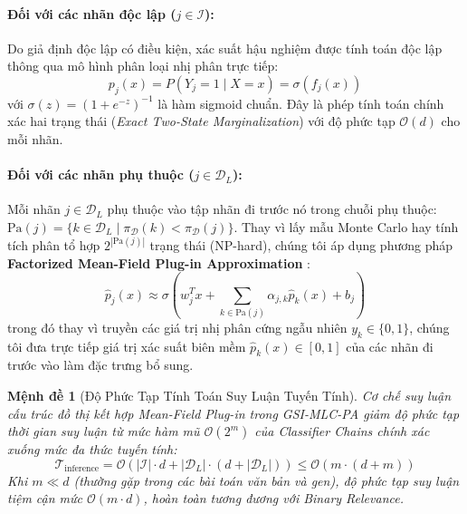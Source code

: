 \documentclass[11pt,a4paper]{article}
\newtheorem{proposition}{Mệnh đề}[section]
\begin{document}
\paragraph{Đối với các nhãn độc lập ($j \in \mathcal{I}$):}
Do giả định độc lập có điều kiện, xác suất hậu nghiệm được tính toán độc lập thông qua mô hình phân loại nhị phân trực tiếp:
\begin{equation}
p_j(x) = P(Y_j = 1 \mid X = x) = \sigma(f_j(x))
\label{eq:inference_il}
\end{equation}
với $\sigma(z) = (1 + e^{-z})^{-1}$ là hàm sigmoid chuẩn. Đây là phép tính toán chính xác hai trạng thái (\textit{Exact Two-State Marginalization}) với độ phức tạp $\mathcal{O}(d)$ cho mỗi nhãn.

\paragraph{Đối với các nhãn phụ thuộc ($j \in \mathcal{D}_L$):}
Mỗi nhãn $j \in \mathcal{D}_L$ phụ thuộc vào tập nhãn đi trước nó trong chuỗi phụ thuộc: $\mathrm{Pa}(j) = \{k \in \mathcal{D}_L \mid \pi_{\mathcal{D}}(k) < \pi_{\mathcal{D}}(j)\}$. Thay vì lấy mẫu Monte Carlo hay tính tích phân tổ hợp $2^{|\mathrm{Pa}(j)|}$ trạng thái (NP-hard), chúng tôi áp dụng phương pháp \textbf{Factorized Mean-Field Plug-in Approximation} \cite{dembczynski2012bayes}:
\begin{equation}
\hat{p}_j(x) \approx \sigma \left( w_j^T x + \sum_{k \in \mathrm{Pa}(j)} \alpha_{j, k} \hat{p}_k(x) + b_j \right)
\label{eq:mean_field_plugin}
\end{equation}
trong đó thay vì truyền các giá trị nhị phân cứng ngẫu nhiên $y_k \in \{0, 1\}$, chúng tôi đưa trực tiếp giá trị xác suất biên mềm $\hat{p}_k(x) \in [0, 1]$ của các nhãn đi trước vào làm đặc trưng bổ sung.

\begin{proposition}[Độ Phức Tạp Tính Toán Suy Luận Tuyến Tính]
Cơ chế suy luận cấu trúc đồ thị kết hợp Mean-Field Plug-in trong GSI-MLC-PA giảm độ phức tạp thời gian suy luận từ mức hàm mũ $\mathcal{O}(2^m)$ của Classifier Chains chính xác xuống mức đa thức tuyến tính:
\begin{equation}
\mathcal{T}_{\mathrm{inference}} = \mathcal{O}\left( |\mathcal{I}| \cdot d + |\mathcal{D}_L| \cdot (d + |\mathcal{D}_L|) \right) \le \mathcal{O}(m \cdot (d + m))
\end{equation}
Khi $m \ll d$ (thường gặp trong các bài toán văn bản và gen), độ phức tạp suy luận tiệm cận mức $\mathcal{O}(m \cdot d)$, hoàn toàn tương đương với Binary Relevance.
\end{proposition}
\end{document}

